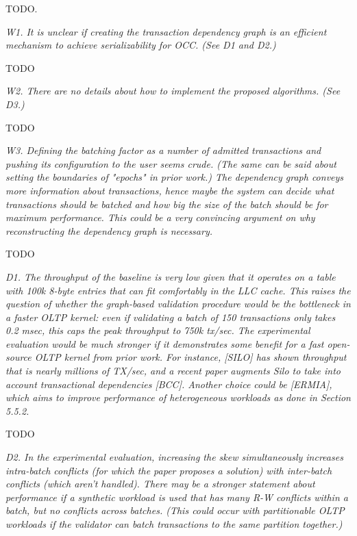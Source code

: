 \documentclass{article}
\begin{document}
\bigskip
TODO.

\bigskip

\emph{W1. It is unclear if creating the transaction dependency graph is an efficient mechanism to achieve serializability for OCC. (See D1 and D2.)}

\bigskip
TODO

\bigskip

\emph{W2. There are no details about how to implement the proposed algorithms. (See D3.)}

\bigskip
TODO

\bigskip

\emph{W3. Defining the batching factor as a number of admitted transactions and pushing its configuration to the user seems crude. (The same can be said about setting the boundaries of "epochs" in prior work.) The dependency graph conveys more information about transactions, hence maybe the system can decide what transactions should be batched and how big the size of the batch should be for maximum performance. This could be a very convincing argument on why reconstructing the dependency graph is necessary.}

\bigskip
TODO
\bigskip

\emph{D1. The throughput of the baseline is very low given that it operates on a table with 100k 8-byte entries that can fit comfortably in the LLC cache. This raises the question of whether the graph-based validation procedure would be the bottleneck in a faster OLTP kernel: even if validating a batch of 150 transactions only takes 0.2 msec, this caps the peak throughput to 750k tx/sec. The experimental evaluation would be much stronger if it demonstrates some benefit for a fast open-source OLTP kernel from prior work. For instance, [SILO] has shown throughput that is nearly millions of TX/sec, and a recent paper augments Silo to take into account transactional dependencies [BCC]. Another choice could be [ERMIA], which aims to improve performance of heterogeneous workloads as done in Section 5.5.2.}

\bigskip
TODO

\bigskip

\emph{D2. In the experimental evaluation, increasing the skew simultaneously increases intra-batch conflicts (for which the paper proposes a solution) with inter-batch conflicts (which aren't handled). There may be a stronger statement about performance if a synthetic workload is used that has many R-W conflicts within a batch, but no conflicts across batches. (This could occur with partitionable OLTP workloads if the validator can batch transactions to the same partition together.)}
\end{document}
